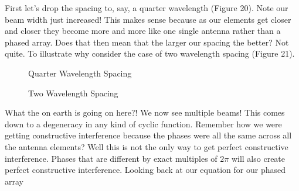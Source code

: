 \documentclass[10pt,a4paper]{article}
\begin{document}
First let's drop the spacing to, say, a quarter wavelength (Figure 20). Note our beam width just increased! This makes sense because as our elements get closer and closer they become more and more like one single antenna rather than a phased array. Does that then mean that the larger our spacing the better? Not quite. To illustrate why consider the case of two wavelength spacing (Figure 21). 

\begin{figure}[!htb]
\caption{\label{fig:my-label} Quarter Wavelength Spacing}
\end{figure}

\begin{figure}[!htb]
\caption{\label{fig:my-label} Two Wavelength Spacing}
\end{figure}

What the on earth is going on here?! We now see multiple beams! This comes down to a degeneracy in any kind of cyclic function. Remember how we were getting constructive interference because the phases were all the same across all the antenna elements? Well this is not the only way to get perfect constructive interference. Phases that are different by exact multiples of $2\pi$ will also create perfect constructive interference. Looking back at our equation for our phased array
\end{document}
